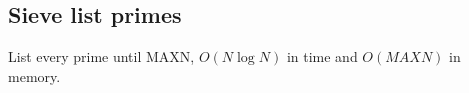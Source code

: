 \subsection{Sieve list primes}

List every prime until MAXN, $O(N\log{N})$ in time and $O(MAXN)$ in memory.
